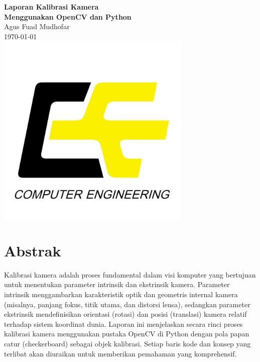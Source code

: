 \documentclass[12pt,a4paper]{article}
\begin{document}

\begin{titlepage}
    \begin{center}
        \vspace*{1cm}
        {\LARGE \textbf{Laporan Kalibrasi Kamera\\Menggunakan OpenCV dan Python}}\\[1.5cm]
        {\large Agus Fuad Mudhofar}\\[0.5cm]
        {\large \today}\\
        \includegraphics[width=0.7\textwidth]{Computer-Engineering-1.jpg}\\[1cm]

    \end{center}
\end{titlepage}
\thispagestyle{empty}
\newpage

\tableofcontents
\newpage

\section{Abstrak}
Kalibrasi kamera adalah proses fundamental dalam visi komputer yang bertujuan
untuk menentukan parameter intrinsik dan ekstrinsik kamera. Parameter intrinsik
menggambarkan karakteristik optik dan geometris internal kamera (misalnya,
panjang fokus, titik utama, dan distorsi lensa), sedangkan parameter ekstrinsik
mendefinisikan orientasi (rotasi) dan posisi (translasi) kamera relatif
terhadap sistem koordinat dunia. Laporan ini menjelaskan secara rinci proses
kalibrasi kamera menggunakan pustaka OpenCV di Python dengan pola papan catur
(checkerboard) sebagai objek kalibrasi. Setiap baris kode dan konsep yang
terlibat akan diuraikan untuk memberikan pemahaman yang komprehensif.
\end{document}
